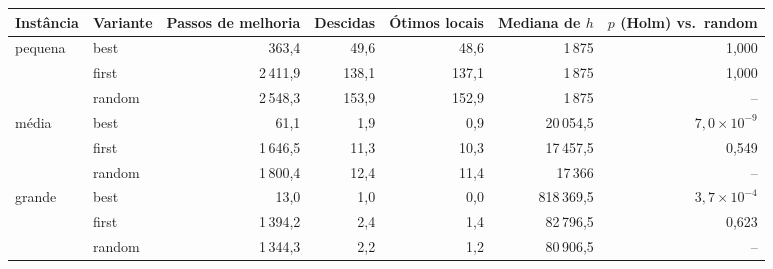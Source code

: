 \begin{tabular}{llrrrrr}
\toprule
Instância & Variante & Passos de melhoria & Descidas & Ótimos locais & Mediana de $h$ & $p$ (Holm) vs.\ random \\
\midrule
pequena & best & 363,4 & 49,6 & 48,6 & 1\,875 & 1,000 \\
 & first & 2\,411,9 & 138,1 & 137,1 & 1\,875 & 1,000 \\
 & random & 2\,548,3 & 153,9 & 152,9 & 1\,875 & -- \\
\midrule
média & best & 61,1 & 1,9 & 0,9 & 20\,054,5 & $7,0\times10^{-9}$ \\
 & first & 1\,646,5 & 11,3 & 10,3 & 17\,457,5 & 0,549 \\
 & random & 1\,800,4 & 12,4 & 11,4 & 17\,366 & -- \\
\midrule
grande & best & 13,0 & 1,0 & 0,0 & 818\,369,5 & $3,7\times10^{-4}$ \\
 & first & 1\,394,2 & 2,4 & 1,4 & 82\,796,5 & 0,623 \\
 & random & 1\,344,3 & 2,2 & 1,2 & 80\,906,5 & -- \\
\bottomrule
\end{tabular}
